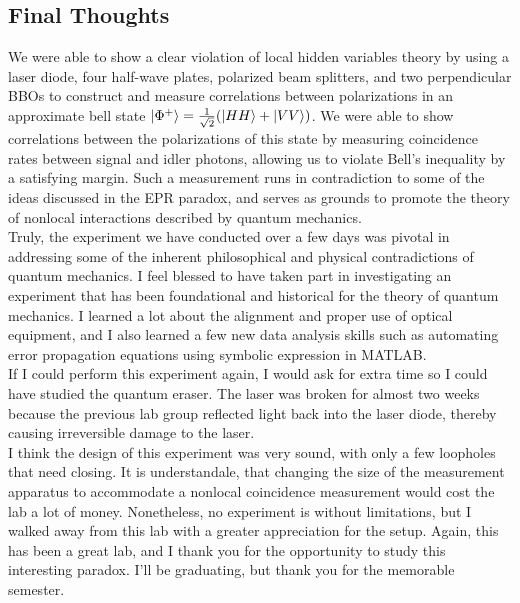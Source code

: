 \documentclass{article}
\begin{document}
    \subsection{Final Thoughts}
    We were able to show a clear violation of local hidden variables theory by using a laser diode, four half-wave plates, polarized beam splitters, and two perpendicular BBOs to construct and measure correlations between polarizations in an approximate bell state $\left\vert{\Phi^+}\right\rangle = \frac{1}{\sqrt{2}}(\left\vert{HH}\right\rangle+\left\vert{VV}\right\rangle)$. We were able to show correlations between the polarizations of this state by measuring coincidence rates between signal and idler photons, allowing us to violate Bell's inequality by a satisfying margin. Such a measurement runs in contradiction to some of the ideas discussed in the EPR paradox, and serves as grounds to promote the theory of nonlocal interactions described by quantum mechanics.
    \\\indent Truly, the experiment we have conducted over a few days was pivotal in addressing some of the inherent philosophical and physical contradictions of quantum mechanics. I feel blessed to have taken part in investigating an experiment that has been foundational and historical for the theory of quantum mechanics. I learned a lot about the alignment and proper use of optical equipment, and I also learned a few new data analysis skills such as automating error propagation equations using symbolic expression in MATLAB.
    \\\indent If I could perform this experiment again, I would ask for extra time so I could have studied the quantum eraser. The laser was broken for almost two weeks because the previous lab group reflected light back into the laser diode, thereby causing irreversible damage to the laser.
    \\\indent I think the design of this experiment was very sound, with only a few loopholes that need closing. It is understandale, that changing the size of the measurement apparatus to accommodate a nonlocal coincidence measurement would cost the lab a lot of money. Nonetheless, no experiment is without limitations, but I walked away from this lab with a greater appreciation for the setup. Again, this has been a great lab, and I thank you for the opportunity to study this interesting paradox. I'll be graduating, but thank you for the memorable semester. 
    
\end{document}
